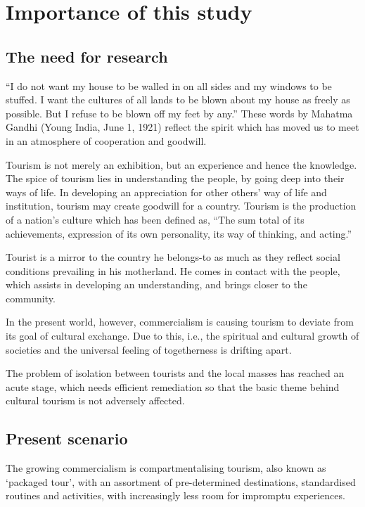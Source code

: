 \chapter{Importance of this study} %
\label{cha:ios}

\section{The need for research} %
\label{sec:nfr}

``I do not want my house to be walled in on all sides and my windows to be stuffed. I want the cultures of all lands to be blown about my house as freely as possible. But I refuse to be blown off my feet by any.'' These words by Mahatma Gandhi (Young India, June 1, 1921) reflect the spirit which has moved us to meet in an atmosphere of cooperation and goodwill.

Tourism is not merely an exhibition, but an experience and hence the knowledge. The spice of tourism lies in understanding the people, by going deep into their ways of life. In developing an appreciation for other others' way of life and institution, tourism may create goodwill for a country. Tourism is the production of a nation's culture which has been defined as, ``The sum total of its achievements, expression of its own personality, its way of thinking, and acting.''

Tourist is a mirror to the country he belongs-to as much as they reflect social conditions prevailing in his motherland. He comes in contact with the people, which assists in developing an understanding, and brings closer to the community.

In the present world, however, commercialism is causing tourism to deviate from its goal of cultural exchange. Due to this, i.e., the spiritual and cultural growth of societies and the universal feeling of togetherness is drifting apart.

The problem of isolation between tourists and the local masses has reached an acute stage, which needs efficient remediation so that the basic theme behind cultural tourism is not adversely affected.


\section{Present scenario} %
\label{sec:psc}

The growing commercialism is compartmentalising tourism, also known as `packaged tour', with an assortment of pre-determined destinations, standardised routines and activities, with increasingly less room for impromptu experiences.

